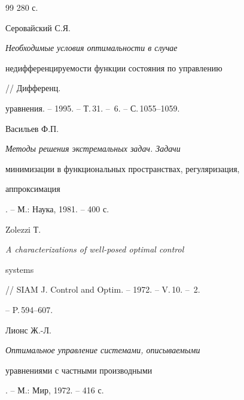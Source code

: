 \begin{thebibliography}{99}
280 с. 




Серовайский С.Я. {\em Необходимые условия оптимальности в случае 


недифференцируемости функции состояния по управлению} // Дифференц. 


уравнения. -- 1995. -- Т.\,31. -- \No\,6. -- С.\,1055--1059. 




Васильев Ф.П. {\em Методы решения экстремальных задач. Задачи 


минимизации в функциональных пространствах, регуляризация, 


аппроксимация}. -- М.: Наука, 1981. -- 400 с. 




Zolezzi Т. {\em A characterizations of well-posed optimal control 


systems} // SIAM J. Control and Optim. -- 1972. -- V.\,10. -- \No\,2. 


-- P.\,594--607. 




Лионс Ж.-Л. {\em Оптимальное управление системами, описываемыми 


уравнениями с частными производными}. -- М.: Мир, 1972. -- 416 с. 


 


\end{thebibliography} 


 


\vskip 2cm 


 






 


\label{end} 


 


